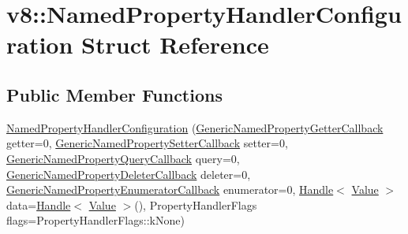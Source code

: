 \hypertarget{structv8_1_1_named_property_handler_configuration}{}\section{v8\+:\+:Named\+Property\+Handler\+Configuration Struct Reference}
\label{structv8_1_1_named_property_handler_configuration}
\subsection*{Public Member Functions}
\begin{DoxyCompactItemize}
\item 
\hyperlink{structv8_1_1_named_property_handler_configuration_a192a4ed58ec8d3398b8fe11a8894f9d4}{Named\+Property\+Handler\+Configuration} (\hyperlink{namespacev8_a24b1801fa53a7c5a71366d8044927563}{Generic\+Named\+Property\+Getter\+Callback} getter=0, \hyperlink{namespacev8_af74716c6e95a269c6cd4314662fd0a7e}{Generic\+Named\+Property\+Setter\+Callback} setter=0, \hyperlink{namespacev8_add9f7ab11e4a9a2b9ad2c4536b0e1a64}{Generic\+Named\+Property\+Query\+Callback} query=0, \hyperlink{namespacev8_ad2aecc0406ea4bc02d5a4f84a433b273}{Generic\+Named\+Property\+Deleter\+Callback} deleter=0, \hyperlink{namespacev8_a20826eb7e52e84fa4f632534e8eddd04}{Generic\+Named\+Property\+Enumerator\+Callback} enumerator=0, \hyperlink{classv8_1_1_handle}{Handle}$<$ \hyperlink{classv8_1_1_value}{Value} $>$ data=\hyperlink{classv8_1_1_handle}{Handle}$<$ \hyperlink{classv8_1_1_value}{Value} $>$(), Property\+Handler\+Flags flags=Property\+Handler\+Flags\+::k\+None)
\end{DoxyCompactItemize}

